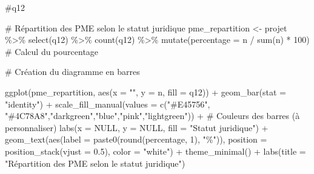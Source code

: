 \documentclass[
  letterpaper,
  DIV=11,
  numbers=noendperiod]{scrartcl}
\newenvironment{Shaded}{\begin{snugshade}}{\end{snugshade}}
\newcommand{\AttributeTok}[1]{\textcolor[rgb]{0.40,0.45,0.13}{#1}}
\newcommand{\CommentTok}[1]{\textcolor[rgb]{0.37,0.37,0.37}{#1}}
\newcommand{\ConstantTok}[1]{\textcolor[rgb]{0.56,0.35,0.01}{#1}}
\newcommand{\DecValTok}[1]{\textcolor[rgb]{0.68,0.00,0.00}{#1}}
\newcommand{\FloatTok}[1]{\textcolor[rgb]{0.68,0.00,0.00}{#1}}
\newcommand{\FunctionTok}[1]{\textcolor[rgb]{0.28,0.35,0.67}{#1}}
\newcommand{\NormalTok}[1]{\textcolor[rgb]{0.00,0.23,0.31}{#1}}
\newcommand{\OtherTok}[1]{\textcolor[rgb]{0.00,0.23,0.31}{#1}}
\newcommand{\SpecialCharTok}[1]{\textcolor[rgb]{0.37,0.37,0.37}{#1}}
\newcommand{\StringTok}[1]{\textcolor[rgb]{0.13,0.47,0.30}{#1}}
\begin{document}
\begin{Shaded}
\begin{Highlighting}[]
\CommentTok{\#q12}


\CommentTok{\# Répartition des PME selon le statut juridique}
\NormalTok{pme\_repartition }\OtherTok{\textless{}{-}}\NormalTok{ projet }\SpecialCharTok{\%\textgreater{}\%}
  \FunctionTok{select}\NormalTok{(q12) }\SpecialCharTok{\%\textgreater{}\%}
  \FunctionTok{count}\NormalTok{(q12) }\SpecialCharTok{\%\textgreater{}\%}
  \FunctionTok{mutate}\NormalTok{(}\AttributeTok{percentage =}\NormalTok{ n }\SpecialCharTok{/} \FunctionTok{sum}\NormalTok{(n) }\SpecialCharTok{*} \DecValTok{100}\NormalTok{)  }\CommentTok{\# Calcul du pourcentage}

\CommentTok{\# Création du diagramme en barres }

\FunctionTok{ggplot}\NormalTok{(pme\_repartition, }\FunctionTok{aes}\NormalTok{(}\AttributeTok{x =} \StringTok{""}\NormalTok{, }\AttributeTok{y =}\NormalTok{ n, }\AttributeTok{fill =}\NormalTok{ q12)) }\SpecialCharTok{+}
  \FunctionTok{geom\_bar}\NormalTok{(}\AttributeTok{stat =} \StringTok{"identity"}\NormalTok{) }\SpecialCharTok{+}
  \FunctionTok{scale\_fill\_manual}\NormalTok{(}\AttributeTok{values =} \FunctionTok{c}\NormalTok{(}\StringTok{"\#E45756"}\NormalTok{, }\StringTok{"\#4C78A8"}\NormalTok{,}\StringTok{"darkgreen"}\NormalTok{,}\StringTok{"blue"}\NormalTok{,}\StringTok{"pink"}\NormalTok{,}\StringTok{"lightgreen"}\NormalTok{)) }\SpecialCharTok{+}  \CommentTok{\# Couleurs des barres (à personnaliser)}
  \FunctionTok{labs}\NormalTok{(}\AttributeTok{x =} \ConstantTok{NULL}\NormalTok{, }\AttributeTok{y =} \ConstantTok{NULL}\NormalTok{, }\AttributeTok{fill =} \StringTok{"Statut juridique"}\NormalTok{) }\SpecialCharTok{+}
  \FunctionTok{geom\_text}\NormalTok{(}\FunctionTok{aes}\NormalTok{(}\AttributeTok{label =} \FunctionTok{paste0}\NormalTok{(}\FunctionTok{round}\NormalTok{(percentage, }\DecValTok{1}\NormalTok{), }\StringTok{"\%"}\NormalTok{)), }\AttributeTok{position =} \FunctionTok{position\_stack}\NormalTok{(}\AttributeTok{vjust =} \FloatTok{0.5}\NormalTok{), }\AttributeTok{color =} \StringTok{"white"}\NormalTok{) }\SpecialCharTok{+}
  \FunctionTok{theme\_minimal}\NormalTok{() }\SpecialCharTok{+}
  \FunctionTok{labs}\NormalTok{(}\AttributeTok{title =} \StringTok{"Répartition des PME selon le statut juridique"}\NormalTok{)}
\end{Highlighting}
\end{Shaded}
\end{document}
